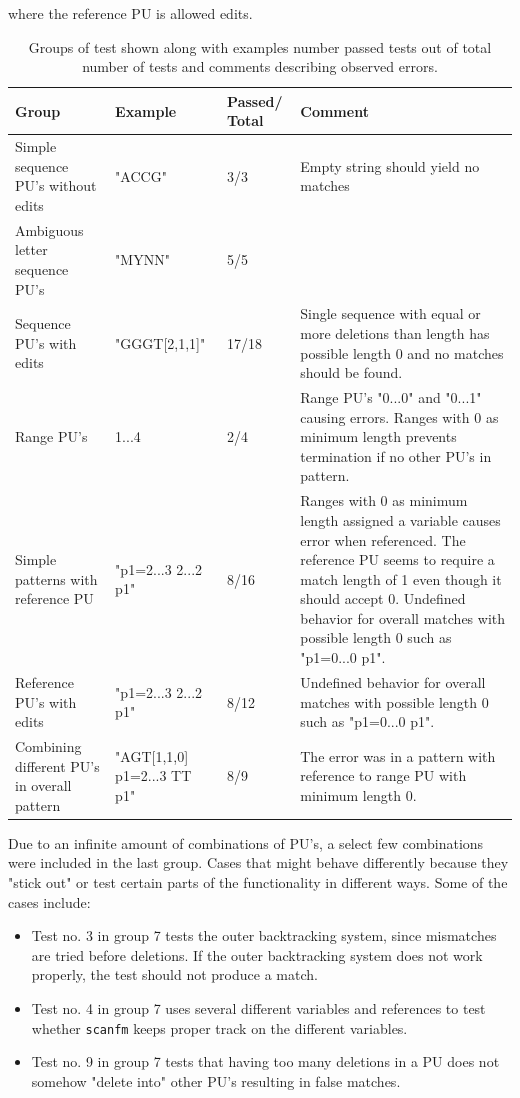 \documentclass[12pt]{article}
\newcommand{\textapprox}{\raisebox{0.5ex}{\texttildelow}}
\newcommand{\sfm}{\texttt{scanfm} }
\newcommand{\pu}{PU }
\newcommand{\pus}{PU's }
\begin{document}
where the reference \pu is allowed edits.
\begin{table}[H]
\begin{tabular}{p{4cm}|p{3cm}|p{1.5cm}|p{7cm}}
\textbf{Group} & \textbf{Example} & \textbf{Passed/
Total} & \textbf{Comment} \\ \hline
Simple sequence PU's without edits & "ACCG" & 3/3 & Empty string should yield no matches \\ \hline
Ambiguous letter sequence PU's & "MYNN" & 5/5 & \\ \hline
Sequence PU's with edits & "GGGT[2,1,1]" & 17/18 & Single sequence with equal or more deletions than length has
possible length 0 and no matches should be found.\\ \hline
Range PU's & 1...4 & 2/4 & Range PU's "0...0" and "0...1" causing errors. Ranges with 0 as minimum length
prevents termination if no other PU's in pattern. \\ \hline
Simple patterns with reference PU & "p1=2...3 2...2 p1" & 8/16 & Ranges with 0 as minimum length assigned a 
variable causes error when referenced. The reference PU seems to require a match length of 1 even though it should 
accept 0. Undefined behavior for overall matches with possible length 0 such as "p1=0...0 p1". \\ \hline
Reference PU's with edits & "p1=2...3 2...2 \textapprox p1" & 8/12 & 
Undefined behavior for overall matches with possible length 0 such as "p1=0...0 \textapprox p1". \\ \hline
Combining different PU's in overall pattern & "AGT[1,1,0] p1=2...3 TT \textapprox p1" & 8/9 &
The error was in a pattern with reference to range PU with minimum length 0.
\end{tabular}
\caption{Groups of test shown along with examples number passed tests out of total number of tests and 
comments describing observed errors.}
\end{table}
\noindent Due to an infinite amount of combinations of PU's, a select few combinations were included in the last group.
Cases that might behave differently because they "stick out" or test certain parts of the functionality in different ways.
Some of the cases include:
\begin{itemize}
\item Test no. 3 in group 7 tests the outer backtracking system, since mismatches are tried before deletions. If the
outer backtracking system does not work properly, the test should not produce a match.
\item Test no. 4 in group 7 uses several different variables and references to test whether \sfm keeps proper
track on the different variables.
\item Test no. 9 in group 7 tests that having too many deletions in a \pu does not somehow "delete into" other \pus
resulting in false matches.
\end{itemize}
\end{document}
